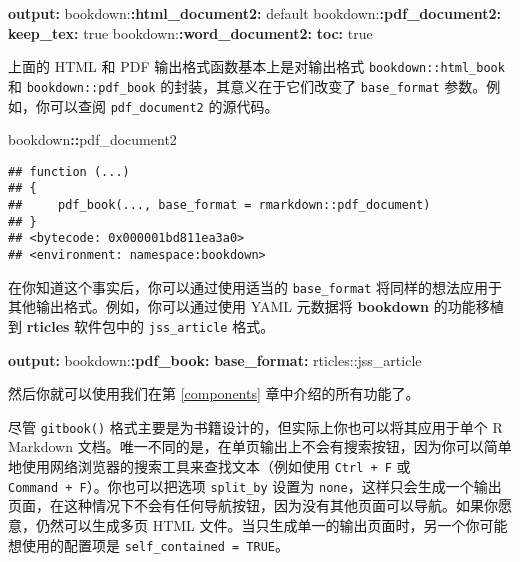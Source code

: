 \documentclass[
  12pt,
]{krantz}
\newenvironment{Shaded}{\begin{snugshade}}{\end{snugshade}}
\newcommand{\AttributeTok}[1]{\textcolor[rgb]{0.13,0.29,0.53}{#1}}
\newcommand{\CharTok}[1]{\textcolor[rgb]{0.31,0.60,0.02}{#1}}
\newcommand{\FunctionTok}[1]{\textcolor[rgb]{0.13,0.29,0.53}{\textbf{#1}}}
\newcommand{\KeywordTok}[1]{\textcolor[rgb]{0.13,0.29,0.53}{\textbf{#1}}}
\newcommand{\NormalTok}[1]{#1}
\newcommand{\SpecialCharTok}[1]{\textcolor[rgb]{0.81,0.36,0.00}{\textbf{#1}}}
\theoremstyle{definition}
\theoremstyle{definition}
\theoremstyle{definition}
\theoremstyle{definition}
\theoremstyle{remark}
\begin{document}
\begin{Shaded}
\begin{Highlighting}[]
\FunctionTok{output}\KeywordTok{:}
\AttributeTok{  bookdown:}\FunctionTok{:html\_document2}\KeywordTok{:}\AttributeTok{ default}
\AttributeTok{  bookdown:}\FunctionTok{:pdf\_document2}\KeywordTok{:}
\AttributeTok{    }\FunctionTok{keep\_tex}\KeywordTok{:}\AttributeTok{ }\CharTok{true}
\AttributeTok{  bookdown:}\FunctionTok{:word\_document2}\KeywordTok{:}
\AttributeTok{    }\FunctionTok{toc}\KeywordTok{:}\AttributeTok{ }\CharTok{true}
\end{Highlighting}
\end{Shaded}

上面的 HTML 和 PDF 输出格式函数基本上是对输出格式 \texttt{bookdown::html\_book} 和 \texttt{bookdown::pdf\_book} 的封装，其意义在于它们改变了 \texttt{base\_format} 参数。例如，你可以查阅 \texttt{pdf\_document2} 的源代码。

\begin{Shaded}
\begin{Highlighting}[]
\NormalTok{bookdown}\SpecialCharTok{::}\NormalTok{pdf\_document2}
\end{Highlighting}
\end{Shaded}

\begin{verbatim}
## function (...) 
## {
##     pdf_book(..., base_format = rmarkdown::pdf_document)
## }
## <bytecode: 0x000001bd811ea3a0>
## <environment: namespace:bookdown>
\end{verbatim}

在你知道这个事实后，你可以通过使用适当的 \texttt{base\_format} 将同样的想法应用于其他输出格式。例如，你可以通过使用 YAML 元数据将 \textbf{bookdown} 的功能移植到 \textbf{rticles} 软件包\citep{R-rticles}中的 \texttt{jss\_article} 格式。

\begin{Shaded}
\begin{Highlighting}[]
\FunctionTok{output}\KeywordTok{:}
\AttributeTok{  bookdown:}\FunctionTok{:pdf\_book}\KeywordTok{:}
\AttributeTok{    }\FunctionTok{base\_format}\KeywordTok{:}\AttributeTok{ rticles::jss\_article}
\end{Highlighting}
\end{Shaded}

然后你就可以使用我们在第 \ref{components} 章中介绍的所有功能了。

尽管 \texttt{gitbook()} 格式主要是为书籍设计的，但实际上你也可以将其应用于单个 R Markdown 文档。唯一不同的是，在单页输出上不会有搜索按钮，因为你可以简单地使用网络浏览器的搜索工具来查找文本（例如使用 \texttt{Ctrl\ +\ F} 或 \texttt{Command\ +\ F}）。你也可以把选项 \texttt{split\_by} 设置为 \texttt{none}，这样只会生成一个输出页面，在这种情况下不会有任何导航按钮，因为没有其他页面可以导航。如果你愿意，仍然可以生成多页 HTML 文件。当只生成单一的输出页面时，另一个你可能想使用的配置项是 \texttt{self\_contained\ =\ TRUE}。
\end{document}
